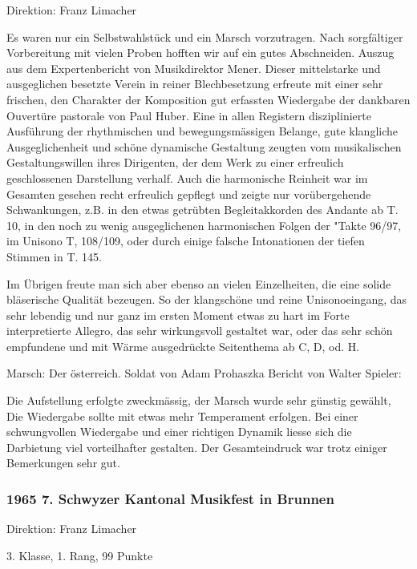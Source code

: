\begin{history}
    Direktion: Franz Limacher

    Es waren nur ein Selbstwahlstück und ein Marsch vorzutragen. Nach
    sorgfältiger Vorbereitung mit vielen Proben hofften wir auf ein gutes
    Abschneiden. Auszug aus dem Expertenbericht von Musikdirektor Mener. Dieser
    mittelstarke und ausgeglichen besetzte Verein in reiner Blechbesetzung
    erfreute mit einer sehr frischen, den Charakter der Komposition gut
    erfassten Wiedergabe der dankbaren Ouvertüre pastorale von Paul Huber. Eine
    in allen Registern disziplinierte Ausführung der rhythmischen und
    bewegungsmässigen Belange, gute klangliche Ausgeglichenheit und schöne
    dynamische Gestaltung zeugten vom musikalischen Gestaltungswillen ihres
    Dirigenten, der dem Werk zu einer erfreulich geschlossenen Darstellung
    verhalf. Auch die harmonische Reinheit war im Gesamten gesehen recht
    erfreulich gepflegt und zeigte nur vorübergehende Schwankungen, z.B. in den
    etwas getrübten Begleitakkorden des Andante ab T. 10, in den noch zu wenig
    ausgeglichenen harmonischen Folgen der "Takte 96/97, im Unisono T, 108/109,
    oder durch einige falsche Intonationen der tiefen Stimmen in T. 145.

    Im Übrigen freute man sich aber ebenso an vielen Einzelheiten, die eine
    solide bläserische Qualität bezeugen. So der klangschöne und reine
    Unisonoeingang, das sehr lebendig und nur ganz im ersten Moment etwas zu
    hart im Forte interpretierte Allegro, das sehr wirkungsvoll gestaltet war,
    oder das sehr schön empfundene und mit Wärme ausgedrückte Seitenthema ab C,
    D, od. H.

    Marsch: Der österreich. Soldat von Adam Prohaszka Bericht von Walter
    Spieler:

    Die Aufstellung erfolgte zweckmässig, der Marsch wurde sehr günstig gewählt,
    Die Wiedergabe sollte mit etwas mehr Temperament erfolgen. Bei einer
    schwungvollen Wiedergabe und einer richtigen Dynamik liesse sich die
    Darbietung viel vorteilhafter gestalten. Der Gesamteindruck war trotz
    einiger Bemerkungen sehr gut.

    \subsubsection*{1965 7. Schwyzer Kantonal Musikfest in Brunnen}

    Direktion: Franz Limacher

    3. Klasse, 1. Rang, 99 Punkte


\end{history}

